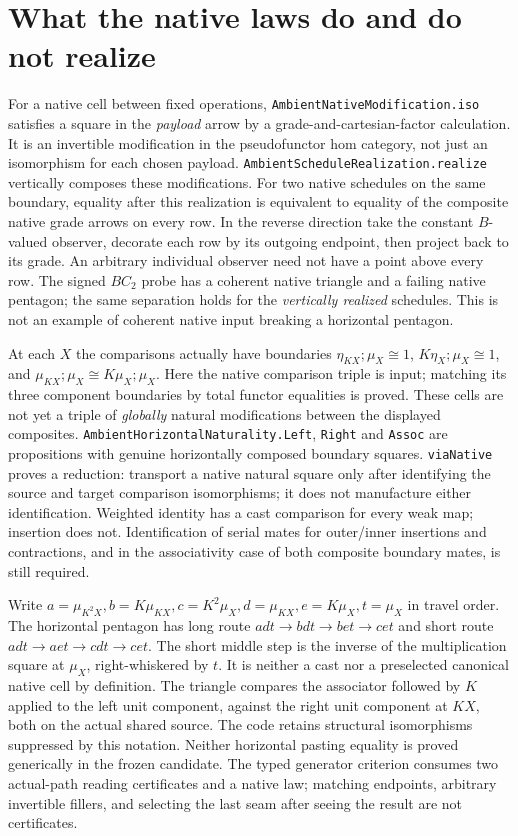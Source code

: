 \documentclass[11pt]{article}
\newcommand{\code}{\nolinkurl}
\begin{document}
\section{What the native laws do and do not realize}
For a native cell between fixed operations, \code{AmbientNativeModification.iso} satisfies a square in the \emph{payload} arrow by a grade-and-cartesian-factor calculation. It is an invertible modification in the pseudofunctor hom category, not just an isomorphism for each chosen payload. \code{AmbientScheduleRealization.realize} vertically composes these modifications. For two native schedules on the same boundary, equality after this realization is equivalent to equality of the composite native grade arrows on every row. In the reverse direction take the constant $B$-valued observer, decorate each row by its outgoing endpoint, then project back to its grade. An arbitrary individual observer need not have a point above every row. The signed $BC_2$ probe has a coherent native triangle and a failing native pentagon; the same separation holds for the \emph{vertically realized} schedules. This is not an example of coherent native input breaking a horizontal pentagon.

At each $X$ the comparisons actually have boundaries $\eta_{KX};\mu_X\cong 1$, $K\eta_X;\mu_X\cong1$, and $\mu_{KX};\mu_X\cong K\mu_X;\mu_X$. Here the native comparison triple is input; matching its three component boundaries by total functor equalities is proved. These cells are not yet a triple of \emph{globally} natural modifications between the displayed composites. \code{AmbientHorizontalNaturality.Left}, \code{Right} and \code{Assoc} are propositions with genuine horizontally composed boundary squares. \code{viaNative} proves a reduction: transport a native natural square only after identifying the source and target comparison isomorphisms; it does not manufacture either identification. Weighted identity has a cast comparison for every weak map; insertion does not. Identification of serial mates for outer/inner insertions and contractions, and in the associativity case of both composite boundary mates, is still required.

Write $a=\mu_{K^2X},b=K\mu_{KX},c=K^2\mu_X,d=\mu_{KX}, e=K\mu_X,t=\mu_X$ in travel order. The horizontal pentagon has long route $adt\to bdt\to bet\to cet$ and short route $adt\to aet\to cdt\to cet$. The short middle step is the inverse of the multiplication square at $\mu_X$, right-whiskered by $t$. It is neither a cast nor a preselected canonical native cell by definition. The triangle compares the associator followed by $K$ applied to the left unit component, against the right unit component at $KX$, both on the actual shared source. The code retains structural isomorphisms suppressed by this notation. Neither horizontal pasting equality is proved generically in the frozen candidate. The typed generator criterion consumes two actual-path reading certificates and a native law; matching endpoints, arbitrary invertible fillers, and selecting the last seam after seeing the result are not certificates.
\end{document}

